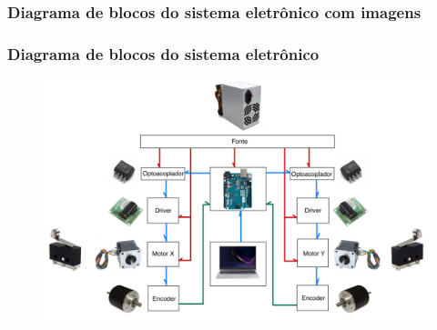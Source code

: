 \subsubsection{Diagrama de blocos do sistema eletrônico com imagens}

\begin{frame}
\frametitle{Diagrama de blocos do sistema eletrônico}

\begin{figure}
\centering
\includegraphics[scale = 0.30]{figuras/diagramblocoscomimagens}
\end{figure}

\end{frame}

